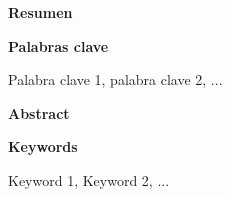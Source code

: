 \documentclass{article}
\begin{document}
\newpage

\thispagestyle{empty}

\begin{center}
{\bf \Huge Resumen}
\end{center}
\onehalfspacing



\begin{center}
{\bf \Large Palabras clave}
\end{center}
Palabra clave 1, palabra clave 2, ...

\newpage

\thispagestyle{empty}

\begin{center}
{\bf \Huge Abstract}
\end{center}



\begin{center}
{\bf \Large Keywords}
\end{center}
Keyword 1, Keyword 2, ...

\newpage



	

\tableofcontents
\newpage
\listoffigures
\newpage
\listoftables
\newpage
\newpage


\newpage


\newpage


\newpage


\end{document}

